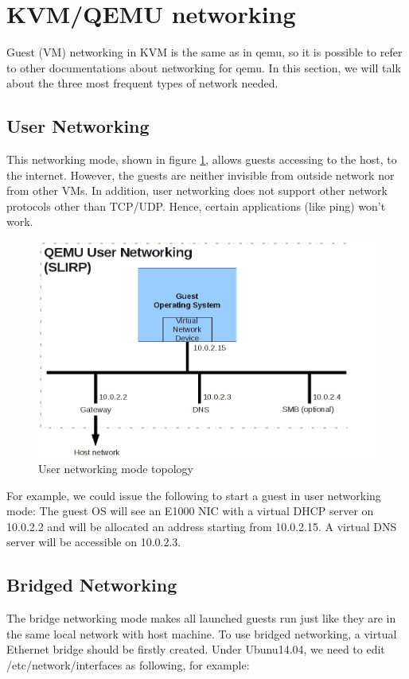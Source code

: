 \section{KVM/QEMU networking}
Guest (VM) networking in KVM is the same as in qemu, 
so it is possible to refer to other documentations about networking for qemu. 
In this section, we will talk about the three most frequent types of network needed.
\subsection{User Networking}
This networking mode, shown in figure \ref{fig:User networking mode topology}, allows guests accessing to the host, to the internet. 
However, the guests are neither invisible from outside network nor from other VMs. 
In addition, user networking does not support other network protocols other than TCP/UDP. 
Hence, certain applications (like ping) won't work.

\begin{figure}[htb]
	\centering
		\includegraphics[scale=0.5]{Figures/Figure9.png}
	\caption[User networking mode topology]{User networking mode topology \cite{Reference24}}
	\label{fig:User networking mode topology}
\end{figure}

For example, we could issue the following to start a guest in user networking mode:
The guest OS will see an E1000 NIC with a virtual DHCP server on 10.0.2.2 and will be 
allocated an address starting from 10.0.2.15. A virtual DNS server will be accessible on 10.0.2.3.

\subsection{Bridged Networking}
The bridge networking mode makes all launched guests run just like they are in the same local network with host machine.  
To use bridged networking, a virtual Ethernet bridge should be firstly created. Under Ubunu14.04, 
we need to edit /etc/network/interfaces as following, for example:

